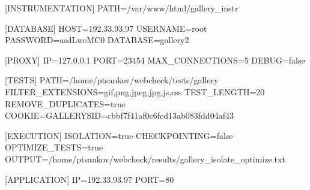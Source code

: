 [INSTRUMENTATION]
PATH=/var/www/html/gallery_instr

[DATABASE]
HOST=192.33.93.97
USERNAME=root
PASSWORD=asdLweMC0
DATABASE=gallery2

[PROXY]
IP=127.0.0.1
PORT=23454
MAX_CONNECTIONS=5
DEBUG=false

[TESTS]
PATH=/home/ptsankov/webcheck/tests/gallery
FILTER_EXTENSIONS=gif,png,jpeg,jpg,js,css
TEST_LENGTH=20
REMOVE_DUPLICATES=true
COOKIE=GALLERYSID=cbbf7f41af0c6fcd13ab083fdd04af43

[EXECUTION]
ISOLATION=true
CHECKPOINTING=false
OPTIMIZE_TESTS=true
OUTPUT=/home/ptsankov/webcheck/results/gallery_isolate_optimize.txt

[APPLICATION]
IP=192.33.93.97
PORT=80
